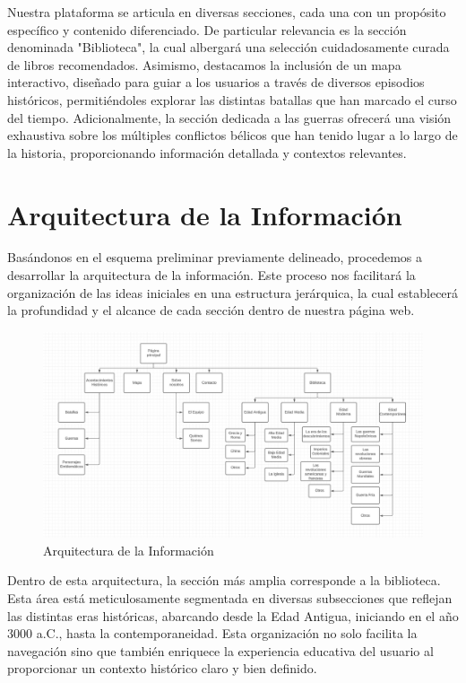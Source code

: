 \documentclass{article}
\begin{document}
Nuestra plataforma se articula en diversas secciones, cada una con un propósito específico y contenido diferenciado. De particular relevancia es la sección denominada "Biblioteca", la cual albergará una selección cuidadosamente curada de libros recomendados. Asimismo, destacamos la inclusión de un mapa interactivo, diseñado para guiar a los usuarios a través de diversos episodios históricos, permitiéndoles explorar las distintas batallas que han marcado el curso del tiempo. Adicionalmente, la sección dedicada a las guerras ofrecerá una visión exhaustiva sobre los múltiples conflictos bélicos que han tenido lugar a lo largo de la historia, proporcionando información detallada y contextos relevantes.

\newpage

\section{Arquitectura de la Información}

Basándonos en el esquema preliminar previamente delineado, procedemos a desarrollar la arquitectura de la información. Este proceso nos facilitará la organización de las ideas iniciales en una estructura jerárquica, la cual establecerá la profundidad y el alcance de cada sección dentro de nuestra página web.

\begin{figure}[H]
    \centering
    \includegraphics[width=1\textwidth]{Esquemas/Arquitectura de Informacion.jpg}
    \caption{Arquitectura de la Información}
    \label{fig:mi_imagen}
\end{figure}

Dentro de esta arquitectura, la sección más amplia corresponde a la biblioteca. Esta área está meticulosamente segmentada en diversas subsecciones que reflejan las distintas eras históricas, abarcando desde la Edad Antigua, iniciando en el año 3000 a.C., hasta la contemporaneidad. Esta organización no solo facilita la navegación sino que también enriquece la experiencia educativa del usuario al proporcionar un contexto histórico claro y bien definido.
\end{document}
